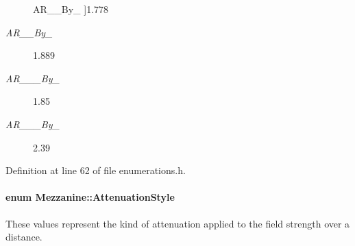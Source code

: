 \begin{Desc}
\begin{description}
{\hypertarget{namespaceMezzanine_a4f14cccd98d1bdc1bf934c1c028e3eafabd1801766c3dd81470e785a604fb8db2}{
AR\_\_\-By\_}
\label{namespaceMezzanine_a4f14cccd98d1bdc1bf934c1c028e3eafabd1801766c3dd81470e785a604fb8db2}
}]1.778 \item[{\em 
\hypertarget{namespaceMezzanine_a4f14cccd98d1bdc1bf934c1c028e3eafa037068693e5a954da062e4f6122d1ad7}{
AR\_\-17\_\-By\_\-9}
\label{namespaceMezzanine_a4f14cccd98d1bdc1bf934c1c028e3eafa037068693e5a954da062e4f6122d1ad7}
}]1.889 \item[{\em 
\hypertarget{namespaceMezzanine_a4f14cccd98d1bdc1bf934c1c028e3eafa14073edea666339eb6fdaa3ca23e946d}{
AR\_\-1\_\-85\_\-By\_\-1}
\label{namespaceMezzanine_a4f14cccd98d1bdc1bf934c1c028e3eafa14073edea666339eb6fdaa3ca23e946d}
}]1.85 \item[{\em 
\hypertarget{namespaceMezzanine_a4f14cccd98d1bdc1bf934c1c028e3eafaa95e86e3db402a75a3de756247da4b29}{
AR\_\-2\_\-39\_\-By\_\-1}
\label{namespaceMezzanine_a4f14cccd98d1bdc1bf934c1c028e3eafaa95e86e3db402a75a3de756247da4b29}
}]2.39 \end{description}
\end{Desc}



Definition at line 62 of file enumerations.h.

\hypertarget{namespaceMezzanine_a2d10a79e11a2031df10af540eede12fa}{
\paragraph[{AttenuationStyle}]{\setlength{\rightskip}{0pt plus 5cm}enum {\bf Mezzanine::AttenuationStyle}}\hfill}
\label{namespaceMezzanine_a2d10a79e11a2031df10af540eede12fa}


These values represent the kind of attenuation applied to the field strength over a distance. 

